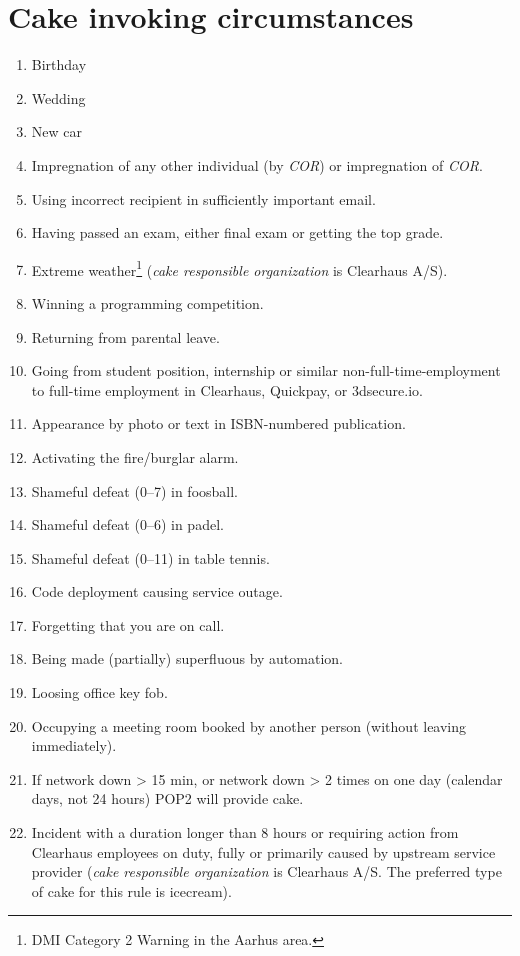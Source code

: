 \documentclass[a4paper, oneside, article]{memoir}
\newcounter{tbc}
\begin{document}
    \chapter{Cake invoking circumstances}\label{chp:circumstances}
    \begin{enumerate}[§ 1]
        \setcounter{enumi}{\value{tbc}}

        \item Birthday
        \item Wedding
        \item New car
        \item Impregnation of any other individual (by \emph{COR}) or impregnation of
        \emph{COR}.
        \item Using incorrect recipient in sufficiently important email.
        \item Having passed an exam, either final exam or getting the top grade.
        \item Extreme weather\footnote{DMI Category 2 Warning in the Aarhus area.} (\emph{cake responsible organization} is Clearhaus A/S).
        \item Winning a programming competition.
        \item Returning from parental leave.
        \item Going from student position, internship or similar non-full-time-employment to full-time employment in Clearhaus, Quickpay, or 3dsecure.io.
        \item Appearance by photo or text in ISBN-numbered publication.
        \item Activating the fire/burglar alarm.
        \item Shameful defeat (0--7) in foosball.
        \item Shameful defeat (0--6) in padel.
        \item Shameful defeat (0--11) in table tennis.
        \item Code deployment causing service outage.
        \item Forgetting that you are on call.
        \item Being made (partially) superfluous by automation.
        \item Loosing office key fob.
        \item Occupying a meeting room booked by another person (without leaving immediately).
        \item If network down > 15 min, or network down > 2 times on one day (calendar days, not 24 hours) POP2 will provide cake.
        \item Incident with a duration longer than 8 hours or requiring action from Clearhaus employees on duty, fully or primarily caused by upstream service provider (\emph{cake responsible organization} is Clearhaus A/S. The preferred type of cake for this rule is icecream).
    \end{enumerate}
\end{document}
